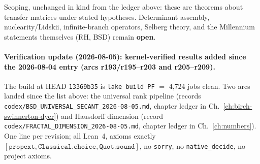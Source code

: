 \noindent Scoping, unchanged in kind from the ledger above: these are
theorems about transfer matrices under stated hypotheses. Determinant
assembly, nuclearity/Lidskii, infinite-branch operators, Selberg theory, and
the Millennium statements themselves (RH, BSD) remain \textbf{open}.

\paragraph{Verification update (2026-08-05): kernel-verified results added
since the 2026-08-04 entry (arcs r193/r195--r203 and r205--r209).}
The build at HEAD \texttt{13369b35} is \texttt{lake build PF} $=$ 4{,}724 jobs
clean. Two arcs landed since the list above: the universal rank pipeline
(records \texttt{codex/BSD\_UNIVERSAL\_SECANT\_2026-08-05.md}, chapter ledger
in Ch.~\ref{ch:birch-swinnerton-dyer}) and Hausdorff dimension (record
\texttt{codex/FRACTAL\_DIMENSION\_2026-08-05.md}, chapter ledger in
Ch.~\ref{ch:numbers}). One line per revision; all Lean~4, axioms exactly
$[\texttt{propext}, \texttt{Classical.choice}, \texttt{Quot.sound}]$, no
\texttt{sorry}, no \texttt{native\_decide}, no project axioms.
